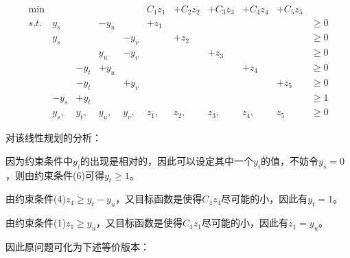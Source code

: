 \begin{footnotesize}
\[
\begin{array}{rrrrrrrrrrrrrrrrr}
 \min &       &   &   &   &  C_{1} z_1 & +C_{2} z_2   & +C_{3} z_3 & +C_{4} z_4& +C_{5}z_5 & \\
  s.t. & y_s &    &-y_u &            &+z_1  &  &  &  & & \geq 0\\
        & y_s &   &         & -y_v    &           &+z_2  &  &  & & \geq 0\\
        &        &   &  y_u & -y_v    &           &           &+z_3 &  & & \geq 0\\
        &        & -y_t  &  +y_u &        &           &           &      & +z_4 & & \geq 0\\
        &        & -y_t  &              &  +y_v      &           &           &      &     &  +z_5 & \geq 0\\
       & -y_s & +y_t  &              &         &           &           &      &     &    & \geq 1\\
      & y_s, & y_t,  & y_u,  & y_v,  &  z_1,  &  z_2,   &  z_3, &  z_4,& z_5 & \geq 0
\end{array} \nonumber
\]
\end{footnotesize}
对该线性规划的分析：
\begin{itemize}
  \begin{small}
  \item 因为约束条件中$y_i$的出现是相对的，因此可以设定其中一个$y_i$的值，不妨令$y_s=0$，则由约束条件(6)可得$y_t\geq 1$。

  \item 由约束条件(4)$z_4 \geq y_t - y_u $，又目标函数是使得$C_4z_4$尽可能的小，因此有$y_t=1$。

  \item 由约束条件(1)$z_1\geq y_u $，又目标函数是使得$C_1z_1$尽可能的小，因此有$z_1=y_u$。

\end{small}
\end{itemize}

因此原问题可化为下述等价版本：

